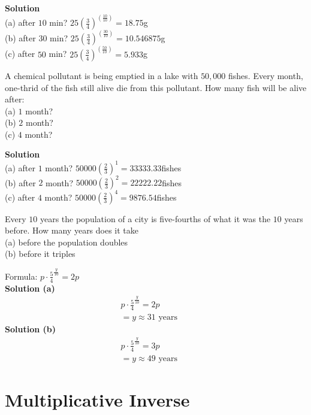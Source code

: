 \documentclass[6pt]{article}
\begin{document}
\textbf{Solution} \\
(a) after $10$ min? $25{(\frac{3}{4})}^{(\frac{10}{10})} = 18.75$g \\
(b) after $30$ min? $25{(\frac{3}{4})}^{(\frac{30}{10})} = 10.546875$g \\
(c) after $50$ min? $25{(\frac{3}{4})}^{(\frac{50}{10})} = 5.933$g

\begin{tcolorbox}[title=Problem 20, breakable]
A chemical pollutant is being emptied in a  lake with $50,000$ fishes. Every month, 
one-thrid of the fish still alive die from this pollutant. How many fish will be 
alive after: \\
(a) $1$ month? \\
(b) $2$ month? \\
(c) $4$ month?
\end{tcolorbox}

\textbf{Solution} \\
(a) after $1$ month? $50000{(\frac{2}{3})}^{1} = 33333.33$fishes \\
(b) after $2$ month? $50000{(\frac{2}{3})}^{2} = 22222.22$fishes \\
(c) after $4$ month? $50000{(\frac{2}{3})}^{4} = 9876.54$fishes


\begin{tcolorbox}[title=Problem 21, breakable]
Every $10$ years the population of a city is five-fourths of what it was the $10$
years before. How many years does it take \\
(a) before the population doubles \\
(b) before it triples
\end{tcolorbox}

Formula: $p \cdot \frac{5}{4}^{\frac{y}{10}} = 2p$ \\
\textbf{Solution (a)}
\begin{align*}
p \cdot \frac{5}{4}^{\frac{y}{10}} = 2p && \\
= y \approx 31\text{ years}
\end{align*}
\textbf{Solution (b)}
\begin{align*}
p \cdot \frac{5}{4}^{\frac{y}{10}} = 3p && \\
= y \approx 49\text{ years}
\end{align*}

\section{Multiplicative Inverse}
\end{document}

